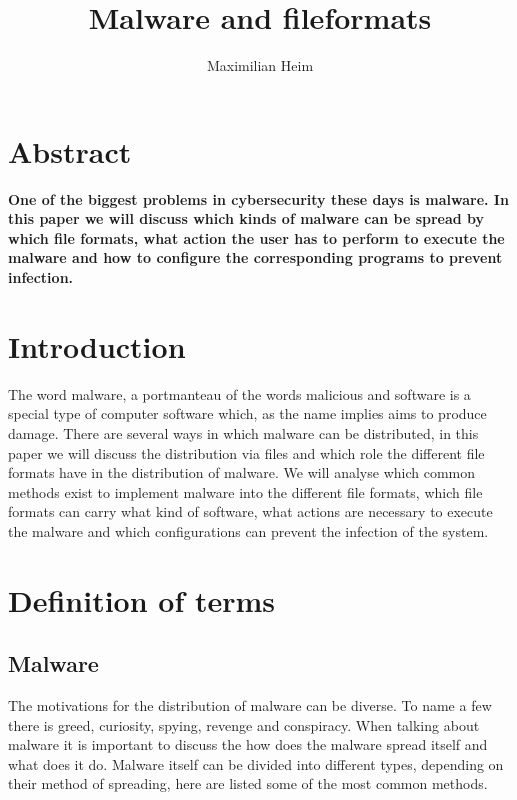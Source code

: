 \documentclass[a4paper,10pt]{article}
\title{Malware and fileformats}
\author{Maximilian Heim}
\begin{document}
\maketitle

\newpage
\tableofcontents

\newpage

\section{Abstract}
\textbf{One of the biggest problems in cybersecurity these days is malware. In this paper we will discuss which kinds of malware can be spread by which file formats, what action the user has to perform to execute the malware and how to configure the corresponding programs to prevent infection.}


\section{Introduction}
The word malware, a portmanteau of the words malicious and software is a special type of computer software which, as the name implies aims to produce damage. There are several ways in which malware can be distributed, in this paper we will discuss the distribution via files and which role the different file formats have in the distribution of malware. We will analyse which common methods exist to implement malware into the different file formats, which file formats can carry what kind of software, what actions are necessary to execute the malware and which configurations can prevent the infection of the system.



\section{Definition of terms}
\subsection{Malware}
The motivations for the distribution of malware can be diverse. To name a few there is greed, curiosity, spying, revenge and conspiracy. \cite{Eschweiler2006}
When talking about malware it is important to discuss the how does the malware spread itself and what does it do.
Malware itself can be divided into different types, depending on their method of spreading, here are listed some of the most common methods.
\end{document}
